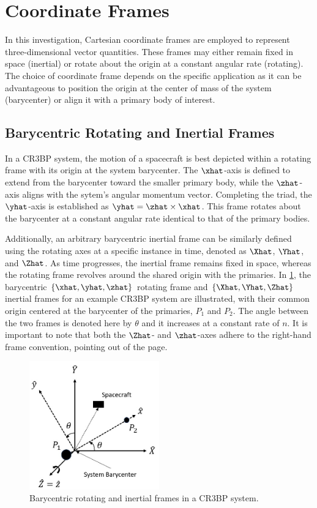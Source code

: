 \section{Coordinate Frames}
In this investigation, Cartesian coordinate frames are employed to represent \\three-dimensional
vector quantities. These frames may either remain fixed in space (inertial) or rotate about the
origin at a constant angular rate (rotating). The choice of coordinate frame depends on the
specific application as it can be advantageous to position the origin at the center of mass of the
system (barycenter) or align it with a primary body of interest.

\subsection{Barycentric Rotating and Inertial Frames}
In a CR3BP system, the motion of a spacecraft is best depicted within a rotating frame with its
origin at the system barycenter. The $\xhat$-axis is defined to extend from the barycenter toward
the smaller primary body, while the $\zhat$-axis aligns with the sytem's angular momentum vector.
Completing the triad, the $\yhat$-axis is established as $\yhat=\zhat\times\xhat$. This frame
rotates about the barycenter at a constant angular rate identical to that of the primary bodies.

Additionally, an arbitrary barycentric inertial frame can be similarly defined using the rotating
axes at a specific instance in time, denoted as $\Xhat$, $\Yhat$, and $\Zhat$. As time progresses,
the inertial frame remains fixed in space, whereas the rotating frame revolves around the shared
origin with the primaries. In \cref{fig:baryFrames}, the barycentric $\{\xhat,\yhat,\zhat\}$
rotating frame and $\{\Xhat,\Yhat,\Zhat\}$ inertial frames for an example CR3BP system are
illustrated, with their common origin centered at the barycenter of the primaries, $P_{1}$ and
$P_{2}$. The angle between the two frames is denoted here by $\theta$ and it increases at a
constant rate of $n$. It is important to note that both the $\Zhat$- and $\zhat$-axes adhere to the
right-hand frame convention, pointing out of the page.

\begin{figure}[ht]
    \centering
    \includegraphics[width=0.5\textwidth]{figures/BaryFrames.jpg}
    \caption{Barycentric rotating and inertial frames in a CR3BP system.}
    \label{fig:baryFrames}
\end{figure}

